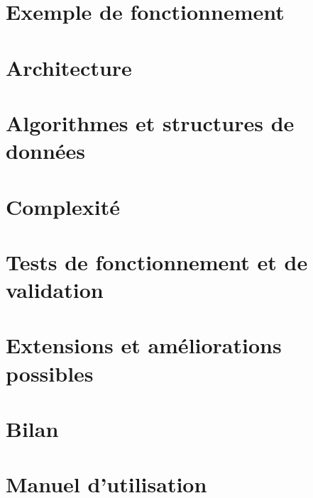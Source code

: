 \documentclass{article}
\begin{document}
\newpage

\section{Exemple de fonctionnement}



\section{Architecture}



\section{Algorithmes et structures de données}



\section{Complexité}



\section{Tests de fonctionnement et de validation}



\section{Extensions et améliorations possibles}



\section{Bilan}



\section{Manuel d'utilisation}



\newpage


\nocite{*}


 
\end{document}
